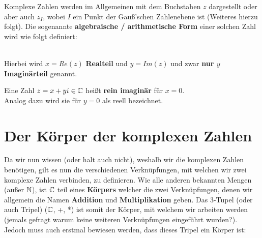 \documentclass[main.tex]{subfiles}
\begin{document}
	\begin{Definition}
		Komplexe Zahlen werden im Allgemeinen mit dem Buchstaben $z$ dargestellt oder aber auch $z_I$, wobei $I$ ein Punkt der Gauß'schen Zahlenebene ist (Weiteres hierzu folgt). Die sogenannte \textbf{algebraische / arithmetische Form} einer solchen Zahl wird wie folgt definiert:
		
		\\
		Hierbei wird $x = Re(z)$ \textbf{Realteil} und $y = Im(z)$ und zwar \textbf{nur $y$ Imaginärteil} genannt.
	\end{Definition}

	\begin{Bemerkung}
		Eine Zahl $z = x + yi \in \mathbb{C}$ heißt \textbf{rein imaginär} für $x = 0$.
		\\
		Analog dazu wird sie für $y = 0$ als reell bezeichnet.
	\end{Bemerkung}


\section{Der Körper der komplexen Zahlen}

	Da wir nun wissen (oder halt auch nicht), weshalb wir die komplexen Zahlen benötigen, gilt es nun die verschiedenen Verknüpfungen, mit welchen wir zwei komplexe Zahlen verbinden, zu definieren. Wie alle anderen bekannten Mengen (außer $\mathbb{N}$), ist $\mathbb{C}$ teil eines \textbf{Körpers} welcher die zwei Verknüpfungen, denen wir allgemein die Namen \textbf{Addition} und \textbf{Multiplikation} geben. Das 3-Tupel (oder auch Tripel) ($\mathbb{C}$, +, *) ist somit der Körper, mit welchem wir arbeiten werden (jemals gefragt warum keine weiteren Verknüpfungen eingeführt wurden?). Jedoch muss auch erstmal bewiesen werden, dass dieses Tripel ein Körper ist:
\end{document}
